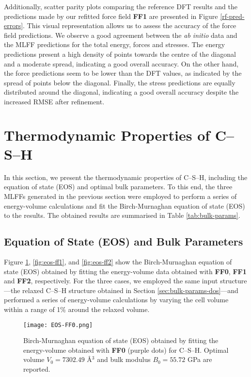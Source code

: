 Additionally, scatter parity plots comparing the reference DFT results and the predictions made by our refitted force field \textbf{FF1} are presented in Figure \ref{rf-pred-errors}. This visual representation allows us to assess the accuracy of the force field predictions. We observe a good agreement between the \emph{ab initio} data and the MLFF predictions for the total energy, forces and stresses. The energy predictions present a high density of points towards the centre of the diagonal and a moderate spread, indicating a good overall accuracy. On the other hand, the force predictions seem to be lower than the DFT values, as indicated by the spread of points below the diagonal. Finally, the stress predictions are equally distributed around the diagonal, indicating a good overall accuracy despite the increased RMSE after refinement.

\section{Thermodynamic Properties of C--S--H}
\label{sec:thermo-properties}
In this section, we present the thermodynamic properties of C--S--H, including the equation of state (EOS) and optimal bulk parameters. To this end, the three MLFFs generated in the previous section were employed to perform a series of energy-volume calculations and fit the Birch-Murnaghan equation of state (EOS) to the results. The obtained results are summarised in Table \ref{tab:bulk-params}.

\subsection{Equation of State (EOS) and Bulk Parameters}
Figure \ref{fig:eos-ff0}, \ref{fig:eos-ff1}, and \ref{fig:eos-ff2} show the Birch-Murnaghan equation of state (EOS) obtained by fitting the energy-volume data obtained with \textbf{FF0}, \textbf{FF1} and \textbf{FF2}, respectively.  For the three cases, we employed the same input structure---the relaxed C--S--H structure obtained in Section \ref{sec:bulk-params-dos}---and performed a series of energy-volume calculations by varying the cell volume within a range of 1\% around the relaxed volume. 


\begin{figure}[h!]
    \centering
    \texttt{[image: EOS-FF0.png]}
    \caption{Birch-Murnaghan equation of state (EOS) obtained by fitting the energy-volume obtained with \textbf{FF0} (purple dots) for C--S--H. Optimal volume $V_0=7302.49$ \AA$^3$ and bulk modulus $B_0=55.72$ GPa are reported.
    }
    \label{fig:eos-ff0}
\end{figure}

